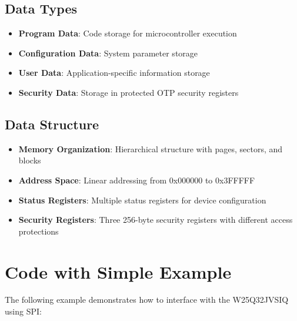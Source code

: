 \subsection{Data Types}
\begin{itemize}
	\item \textbf{Program Data}: Code storage for microcontroller execution
	\item \textbf{Configuration Data}: System parameter storage
	\item \textbf{User Data}: Application-specific information storage
	\item \textbf{Security Data}: Storage in protected OTP security registers \cite{Jotrin:2018}
\end{itemize}

\subsection{Data Structure}
\begin{itemize}
	\item \textbf{Memory Organization}: Hierarchical structure with pages, sectors, and blocks
	\item \textbf{Address Space}: Linear addressing from 0x000000 to 0x3FFFFF
	\item \textbf{Status Registers}: Multiple status registers for device configuration
	\item \textbf{Security Registers}: Three 256-byte security registers with different access protections \cite{Winbond:2016}
\end{itemize}

\section{Code with Simple Example}

The following example demonstrates how to interface with the W25Q32JVSIQ using SPI:

